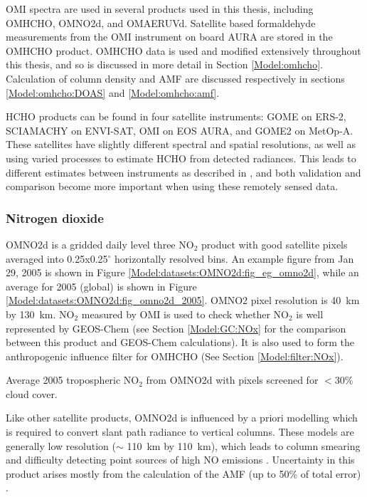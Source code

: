       OMI spectra are used in several products used in this thesis, including OMHCHO, OMNO2d, and OMAERUVd.
      Satellite based formaldehyde measurements from the OMI instrument on board AURA are stored in the OMHCHO product.
      OMHCHO data is used and modified extensively throughout this thesis, and so is discussed in more detail in Section \ref{Model:omhcho}.
      Calculation of column density and AMF are discussed respectively in sections \ref{Model:omhcho:DOAS} and \ref{Model:omhcho:amf}.
      
      
      HCHO products can be found in four satellite instruments: GOME on ERS-2, SCIAMACHY on ENVI-SAT, OMI on EOS AURA, and GOME2 on MetOp-A.
      These satellites have slightly different spectral and spatial resolutions, as well as using varied processes to estimate HCHO from detected radiances.
      This leads to different estimates between instruments as described in \textcite{Lorente2017}, and both validation and comparison become more important when using these remotely sensed data.
      
    \subsubsection{Nitrogen dioxide}
      \label{Model:datasets:OMNO2d}
      OMNO2d is a gridded daily level three NO$_2$ product with good satellite pixels averaged into 0.25x0.25$^{\circ}$ horizontally resolved bins.
      An example figure from Jan 29, 2005 is shown in Figure \ref{Model:datasets:OMNO2d:fig_eg_omno2d}, while an average for 2005 (global) is shown in Figure \ref{Model:datasets:OMNO2d:fig_omno2d_2005}.
      OMNO2 pixel resolution is 40~km by 130~km.
      NO$_2$ measured by OMI is used to check whether NO$_2$ is well represented by GEOS-Chem (see Section \ref{Model:GC:NOx} for the comparison between this product and GEOS-Chem calculations).
      It is also used to form the anthropogenic influence filter for OMHCHO (See Section \ref{Model:filter:NOx}).
      
      
      
      {Average 2005 tropospheric NO$_2$ from OMNO2d with pixels screened for $<30\%$ cloud cover.}
      {\label{Model:datasets:OMNO2d:fig_omno2d_2005}}
      
      Like other satellite products, OMNO2d is influenced by a priori modelling which is required to convert slant path radiance to vertical columns.
      These models are generally low resolution ($\sim$ 110~km by 110~km), which leads to column smearing and difficulty detecting point sources of high NO emissions \parencite{Goldberg2018}.
      Uncertainty in this product arises mostly from the calculation of the AMF (up to 50\% of total error) \parencite{Lorente2017}.
    
